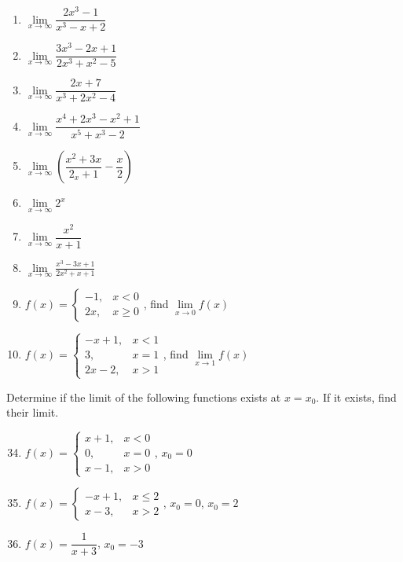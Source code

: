 \documentclass[12pt]{report}
\begin{document}
\begin{multicols}{2}
\begin{enumerate}
    \item $\lim\limits_{x\to\infty}{\dfrac{2x^{3}-1}{x^{3}-x+2}}$
    \item $\lim\limits_{x\to\infty}{\dfrac{3x^{3}-2x+1}{2x^{3}+x^{2}-5}}$
    \item $\lim\limits_{x\to\infty}{\dfrac{2x+7}{x^{3}+2x^{2}-4}}$
    \item $\lim\limits_{x\to\infty}{\dfrac{x^{4}+2x^{3}-x^{2}+1}{x^{5}+x^{3}-2}}$
    \item $\lim\limits_{x\to\infty}\left({\dfrac{x^{2}+3x}{2_x+1}}-{\dfrac{x}{2}}\right)$
    \item $\lim\limits_{x\to\infty}2^{x}$
    \item $\lim\limits_{x\to\infty}{\dfrac{x^{2}}{x+1}}$
    \item $\lim\limits_{x\to\infty}{\frac{x^{3}-3x+1}{2x^{2}+x+1}}$
    \item $f(x) = \left\{\begin{array}{rl}
              -1, & x < 0    \\
              2x, & x \geq 0
            \end{array}\right.$, find $\lim\limits_{x\to0}f(x)$
    \item $f(x) = \left\{\begin{array}{rl}
              -x+1,   & x < 1 \\
              3,      & x = 1 \\
              2x - 2, & x > 1
            \end{array}\right.$, find $\lim\limits_{x\to1}f(x)$
  \end{enumerate}
  Determine if the limit of the following functions exists at $x = x_0$. If it
  exists, find their limit.
  \begin{enumerate}
    \setcounter{enumi}{33}
    \item $f(x) = \left\{\begin{array}{rl}
              x+1, & x < 0 \\
              0,   & x = 0 \\
              x-1, & x > 0
            \end{array}\right.$, $x_0 = 0$

    \item $f(x) = \left\{\begin{array}{rl}
              -x + 1, & x \leq 2 \\
              x - 3,  & x > 2
            \end{array}\right.$, $x_0 = 0$, $x_0 = 2$

    \item $f(x) = \dfrac{1}{x+3}$, $x_0 = -3$
  \end{enumerate}
\end{multicols}
\end{document}

